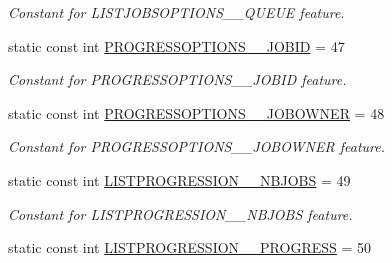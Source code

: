 \begin{DoxyCompactItemize}
\begin{DoxyCompactList}\small\item\em Constant for LISTJOBSOPTIONS\_\-\_\-QUEUE feature. \item\end{DoxyCompactList}\item 
\hypertarget{classTMS__Data_1_1TMS__DataPackage_a47b61def727bcc2798961259265fb12c}{
static const int \hyperlink{classTMS__Data_1_1TMS__DataPackage_a47b61def727bcc2798961259265fb12c}{PROGRESSOPTIONS\_\-\_\-JOBID} = 47}
\label{classTMS__Data_1_1TMS__DataPackage_a47b61def727bcc2798961259265fb12c}

\begin{DoxyCompactList}\small\item\em Constant for PROGRESSOPTIONS\_\-\_\-JOBID feature. \item\end{DoxyCompactList}\item 
\hypertarget{classTMS__Data_1_1TMS__DataPackage_a7f5f26cafa097500c310a6e475259efa}{
static const int \hyperlink{classTMS__Data_1_1TMS__DataPackage_a7f5f26cafa097500c310a6e475259efa}{PROGRESSOPTIONS\_\-\_\-JOBOWNER} = 48}
\label{classTMS__Data_1_1TMS__DataPackage_a7f5f26cafa097500c310a6e475259efa}

\begin{DoxyCompactList}\small\item\em Constant for PROGRESSOPTIONS\_\-\_\-JOBOWNER feature. \item\end{DoxyCompactList}\item 
\hypertarget{classTMS__Data_1_1TMS__DataPackage_a2cc2090b976d273e88da8a4f3f113c6f}{
static const int \hyperlink{classTMS__Data_1_1TMS__DataPackage_a2cc2090b976d273e88da8a4f3f113c6f}{LISTPROGRESSION\_\-\_\-NBJOBS} = 49}
\label{classTMS__Data_1_1TMS__DataPackage_a2cc2090b976d273e88da8a4f3f113c6f}

\begin{DoxyCompactList}\small\item\em Constant for LISTPROGRESSION\_\-\_\-NBJOBS feature. \item\end{DoxyCompactList}\item 
\hypertarget{classTMS__Data_1_1TMS__DataPackage_a3d525d62f014ec8f33dc67160f6912dd}{
static const int \hyperlink{classTMS__Data_1_1TMS__DataPackage_a3d525d62f014ec8f33dc67160f6912dd}{LISTPROGRESSION\_\-\_\-PROGRESS} = 50}
\label{classTMS__Data_1_1TMS__DataPackage_a3d525d62f014ec8f33dc67160f6912dd}


\end{DoxyCompactItemize}
